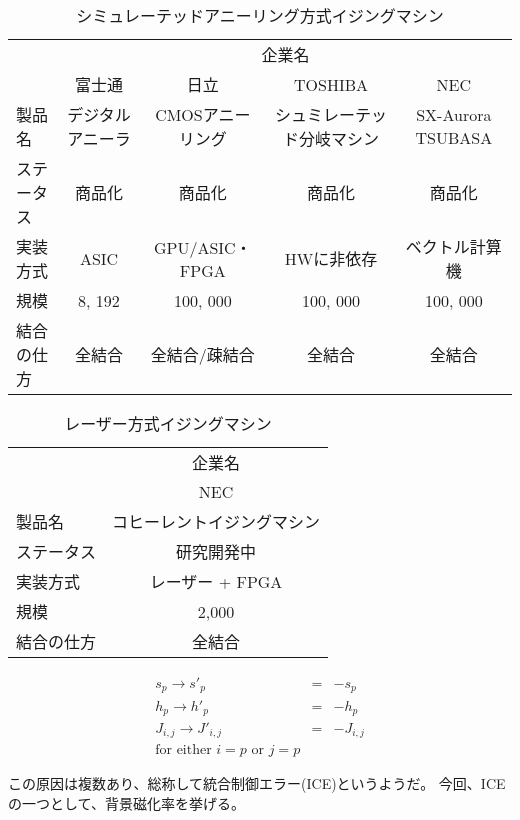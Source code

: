 \begin{minipage}{0.3\textheight}
	\begin{table}[hbtp]
		\caption{シミュレーテッドアニーリング方式イジングマシン}
		\label{tb:sa_machine}
		\centering
		\begin{tabular}{lcccc}
			\hline
			&\multicolumn{4}{c}{企業名} \\
			& 富士通 & 日立 & TOSHIBA & NEC\\
			\hline\hline
			製品名 & デジタルアニーラ & CMOSアニーリング & シュミレーテッド分岐マシン & SX-Aurora TSUBASA\\
			ステータス & 商品化 & 商品化 & 商品化 & 商品化\\
			実装方式 & ASIC & GPU/ASIC・FPGA & HWに非依存 & ベクトル計算機\\
			規模 & 8, 192 & 100, 000 & 100, 000 & 100, 000 \\
			結合の仕方 & 全結合 & 全結合/疎結合 & 全結合 & 全結合\\
			\hline
		\end{tabular}
	\end{table}
\end{minipage}
\begin{minipage}{0.3\textheight}
	\begin{table}[hbtp]
		\caption{レーザー方式イジングマシン}
		\label{tb:laser_machine}
		\centering
		\begin{tabular}{lc}
			\hline
			&企業名 \\
			& NEC\\
			\hline\hline
			製品名 & コヒーレントイジングマシン\\
			ステータス & 研究開発中\\
			実装方式 & レーザー + FPGA\\
			規模 & 2,000\\
			結合の仕方 & 全結合\\
			\hline
		\end{tabular}
	\end{table}
\end{minipage}

\begin{eqnarray}
	s_p \rightarrow s'_p &=& -s_p \\ \nonumber
	h_p \rightarrow h'_p &=& -h_p \\ \nonumber
	J_{i,j} \rightarrow J'_{i,j} &=&-J_{i,j}　\\ \nonumber
	\mbox{for either $i=p$ or $j=p$}
\end{eqnarray}


この原因は複数あり、総称して統合制御エラー(ICE)というようだ。
今回、ICEの一つとして、背景磁化率を挙げる。

